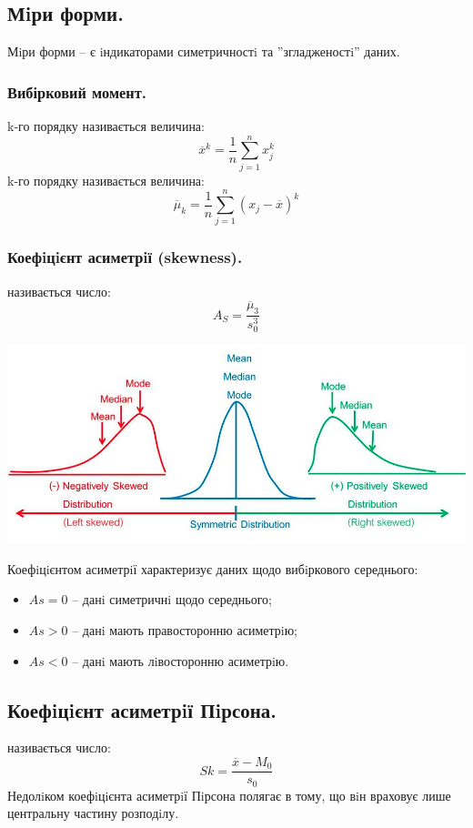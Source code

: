 \subsection{Мiри форми.}
Мiри форми – є iндикаторами симетричностi та ''згладженостi'' даних.
\subsubsection{Вибірковий момент.}
 k-го порядку називається величина:
$$
\overline{x}^k = \frac{1}{n}  \sum\limits_{j = 1}^{n}{x_j^k}
$$
 k-го порядку називається величина:
$$
\overline{\mu}_k = \frac{1}{n}  \sum\limits_{j = 1}^{n}{(x_j - \overline{x})^k}
$$

\subsubsection{Коефiцiєнт асиметрiї (skewness).}
 називається число:
$$
A_S = \frac{\overline{\mu}_3}{s_0^3}
$$
\begin{center}
 \includegraphics[scale=0.45]{assets/lectures_part_5-ad0b36c5.png}
\end{center}
Коефiцiєнтом асиметрiї характеризує  даних щодо вибiркового середнього:
\begin{itemize}
\item $As = 0$ -- данi симетричнi щодо середнього;
\item $As > 0$ -- данi мають правосторонню асиметрiю;
\item $As < 0$ -- данi мають лiвосторонню асиметрiю.
\end{itemize}
\subsection{Коефiцiєнт асиметрiї Пiрсона.}
 називається число:
$$
Sk = \frac{\overline{x} - M_0}{s_0}
$$
Недолiком коефiцiєнта асиметрiї Пiрсона полягає в тому, що вiн враховує лише центральну
частину розподiлу.
